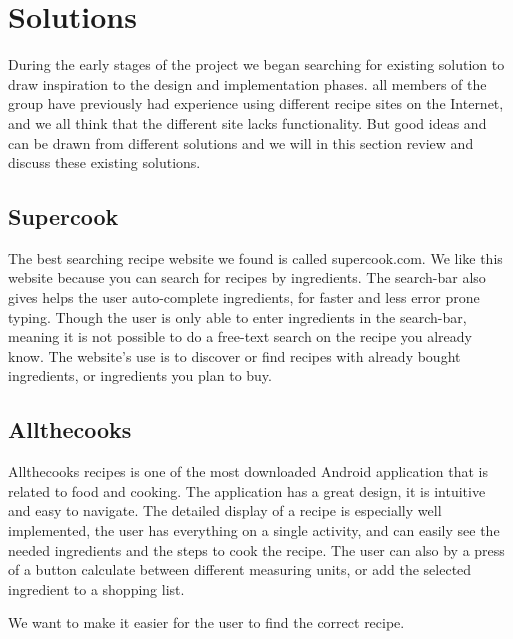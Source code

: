 \section{Solutions}
During the early stages of the project we began searching for existing solution to draw inspiration to the design and implementation phases. all members of the group have previously had experience using different recipe sites on the Internet, and we all think that the different site lacks functionality. But good ideas and can be drawn from different solutions and we will in this section review and discuss these existing solutions.  

\subsection*{Supercook}
The best searching recipe website we found is called supercook.com\cite{supercook}. We like this website because you can search for recipes by ingredients. The search-bar also gives helps the user auto-complete ingredients, for faster and less error prone typing. Though the user is only able to enter ingredients in the search-bar, meaning it is not possible to do a free-text search on the recipe you already know. The website's use is to discover or find recipes with already bought ingredients, or ingredients you plan to buy.

\subsection*{Allthecooks}
Allthecooks recipes is one of the most downloaded Android application that is related to food and cooking. The application has a great design, it is intuitive and easy to navigate. The detailed display of a recipe is especially well implemented, the user has everything on a single activity, and can easily see the needed ingredients and the steps to cook the recipe. The user can also by a press of a button calculate between different measuring units, or add the selected ingredient to a shopping list.


We want to make it easier for the user to find the correct recipe.


